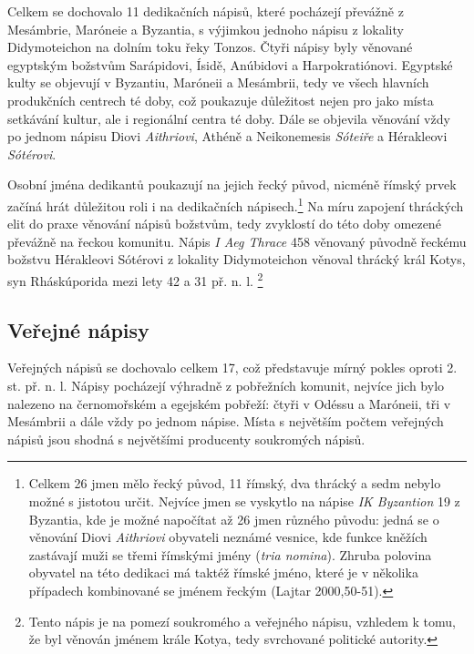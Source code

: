 Celkem se dochovalo 11 dedikačních nápisů, které pocházejí převážně z Mesámbrie, Maróneie a Byzantia, s výjimkou jednoho nápisu z lokality Didymoteichon na dolním toku řeky Tonzos. Čtyři nápisy byly věnované egyptským božstvům Sarápidovi, Ísidě, Anúbidovi a Harpokratiónovi. Egyptské kulty se objevují v Byzantiu, Maróneii a Mesámbrii, tedy ve všech hlavních produkčních centrech té doby, což poukazuje důležitost nejen pro jako místa setkávání kultur, ale i regionální centra té doby. Dále se objevila věnování vždy po jednom nápisu Diovi {\em Aithriovi}, Athéně a Neikonemesis {\em Sóteiře} a Hérakleovi {\em Sótérovi}.

Osobní jména dedikantů poukazují na jejich řecký původ, nicméně římský prvek začíná hrát důležitou roli i na dedikačních nápisech.\footnote{Celkem 26 jmen mělo řecký původ, 11 římský, dva thrácký a sedm nebylo možné s jistotou určit. Nejvíce jmen se vyskytlo na nápise {\em IK Byzantion} 19 z Byzantia, kde je možné napočítat až 26 jmen různého původu: jedná se o věnování Diovi {\em Aithriovi} obyvateli neznámé vesnice, kde funkce kněžích zastávají muži se třemi římskými jmény ({\em tria nomina}). Zhruba polovina obyvatel na této dedikaci má taktéž římské jméno, které je v několika případech kombinované se jménem řeckým (Lajtar 2000,50-51).} Na míru zapojení thráckých elit do praxe věnování nápisů božstvům, tedy zvyklostí do této doby omezené převážně na řeckou komunitu. Nápis {\em I Aeg Thrace} 458 věnovaný původně řeckému božstvu Hérakleovi Sótérovi z lokality Didymoteichon věnoval thrácký král Kotys, syn Rháskúporida mezi lety 42 a 31 př. n. l. \footnote{Tento nápis je na pomezí soukromého a veřejného nápisu, vzhledem k tomu, že byl věnován jménem krále Kotya, tedy svrchované politické autority.}

\subsection[veřejné-nápisy-9]{Veřejné nápisy}

Veřejných nápisů se dochovalo celkem 17, což představuje mírný pokles oproti 2. st. př. n. l. Nápisy pocházejí výhradně z pobřežních komunit, nejvíce jich bylo nalezeno na černomořském a egejském pobřeží: čtyři v Odéssu a Maróneii, tři v Mesámbrii a dále vždy po jednom nápise. Místa s největším počtem veřejných nápisů jsou shodná s největšími producenty soukromých nápisů.

